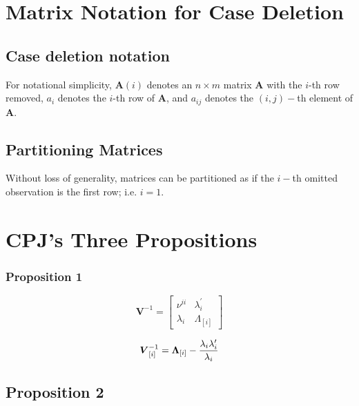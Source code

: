 \documentclass[Main.tex]{subfiles}
\begin{document}



\newpage
\section{Matrix Notation for Case Deletion} %

\subsection{Case deletion notation} %

For notational simplicity, $\boldsymbol{A}(i)$ denotes an $n \times m$ matrix $\boldsymbol{A}$ with the $i$-th row
removed, $a_i$ denotes the $i$-th row of $\boldsymbol{A}$, and $a_{ij}$ denotes the $(i, j)-$th element of $\boldsymbol{A}$.

\subsection{Partitioning Matrices} %
Without loss of generality, matrices can be partitioned as if the $i-$th omitted observation is the first row; i.e. $i=1$.

\section{CPJ's Three Propositions} %




\subsubsection{Proposition 1}


\[
\boldsymbol{V}^{-1} =
\left[ \begin{array}{cc}
\nu^{ii} & \lambda_{i}^{\prime}  \\
\lambda_{i} & \Lambda_{[i]}
\end{array}\right] \]




\[\boldsymbol{V}_{[i]}^{-1} = \boldsymbol{\Lambda}_{[i]} - { \lambda_{i} \lambda_{i} ^{\prime} \over \lambda_{i} } \]


\subsection{Proposition 2}
\end{document}
